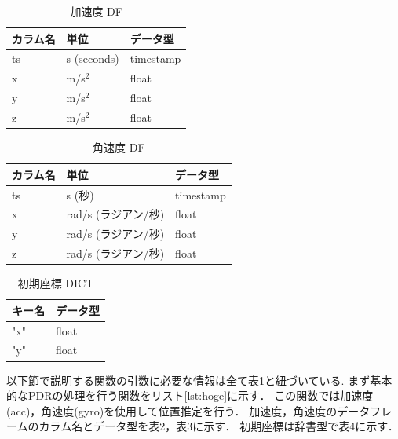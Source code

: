 \documentclass[Japanese]{dicomopapers}
\begin{document}
\begin{table}[h]
	\centering
	\begin{tabular}{lll}
		\toprule
		カラム名 & 単位          & データ型      \\
		\midrule
		ts   & s (seconds) & timestamp \\
		x    & m/s\(^2\)   & float     \\
		y    & m/s\(^2\)   & float     \\
		z    & m/s\(^2\)   & float     \\
		\bottomrule
	\end{tabular}
	\caption{加速度 DF}
\end{table}

\begin{table}[h]
	\centering
	\begin{tabular}{lll}
		\toprule
		カラム名 & 単位             & データ型      \\
		\midrule
		ts   & s (秒)          & timestamp \\
		x    & rad/s (ラジアン/秒) & float     \\
		y    & rad/s (ラジアン/秒) & float     \\
		z    & rad/s (ラジアン/秒) & float     \\
		\bottomrule
	\end{tabular}
	\caption{角速度 DF}
\end{table}

\begin{table}[h]
	\centering
	\begin{tabular}{l l}
		\hline
		キー名 & データ型  \\
		\hline
		"x" & float \\
		"y" & float \\
		\hline
	\end{tabular}
	\caption{初期座標 DICT}
\end{table}

以下節で説明する関数の引数に必要な情報は全て表1と紐づいている.
まず基本的なPDRの処理を行う関数をリスト\ref{lst:hoge}に示す．
この関数では加速度(acc)，角速度(gyro)を使用して位置推定を行う．
加速度，角速度のデータフレームのカラム名とデータ型を表2，表3に示す．
初期座標は辞書型で表4に示す．
\end{document}
